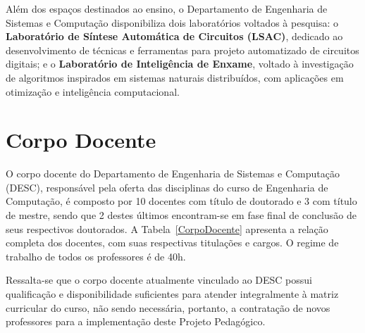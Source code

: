 Além dos espaços destinados ao ensino, o Departamento de Engenharia de Sistemas e Computação disponibiliza dois laboratórios voltados à pesquisa: o \textbf{Laboratório de Síntese Automática de Circuitos (LSAC)}, dedicado ao desenvolvimento de técnicas e ferramentas para projeto automatizado de circuitos digitais; e o \textbf{Laboratório de Inteligência de Enxame}, voltado à investigação de algoritmos inspirados em sistemas naturais distribuídos, com aplicações em otimização e inteligência computacional.

\section{Corpo Docente}

O corpo docente do Departamento de Engenharia de Sistemas e Computação (DESC), responsável pela oferta das disciplinas do curso de Engenharia de Computação, é composto por 10 docentes com título de doutorado e 3 com título de mestre, sendo que 2 destes últimos encontram-se em fase final de conclusão de seus respectivos doutorados. A Tabela~\ref{CorpoDocente} apresenta a relação completa dos docentes, com suas respectivas titulações e cargos. O regime de trabalho de todos os professores é de 40h.

Ressalta-se que o corpo docente atualmente vinculado ao DESC possui qualificação e disponibilidade suficientes para atender integralmente à matriz curricular do curso, não sendo necessária, portanto, a contratação de novos professores para a implementação deste Projeto Pedagógico.

